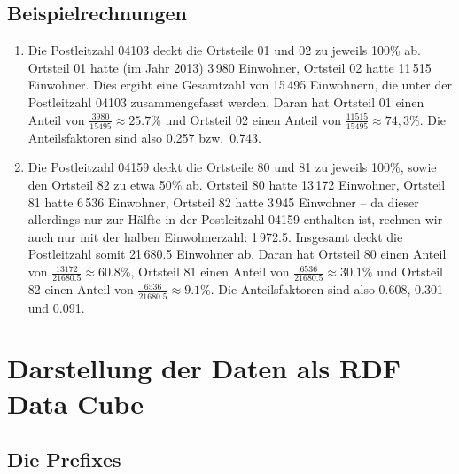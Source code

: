\documentclass[a4paper,11pt]{article}
\begin{document}
\subsection{Beispielrechnungen}
\begin{enumerate}
\item Die Postleitzahl 04103 deckt die Ortsteile 01 und 02 zu jeweils 100\%
  ab.  Ortsteil 01 hatte (im Jahr 2013) 3\,980 Einwohner, Ortsteil 02 hatte
  11\,515 Einwohner.  Dies ergibt eine Gesamtzahl von 15\,495 Einwohnern, die
  unter der Postleitzahl 04103 zusammengefasst werden. Daran hat Ortsteil 01
  einen Anteil von $\frac{3980}{15495}\approx 25.7\%$ und Ortsteil 02 einen
  Anteil von $\frac{11515}{15495}\approx 74,3\%$. Die Anteilsfaktoren sind
  also 0.257 bzw.\ 0.743.

\item Die Postleitzahl 04159 deckt die Ortsteile 80 und 81 zu jeweils 100\%,
  sowie den Ortsteil 82 zu etwa 50\% ab. Ortsteil 80 hatte 13\,172 Einwohner,
  Ortsteil 81 hatte 6\,536 Einwohner, Ortsteil 82 hatte 3\,945 Einwohner -- da
  dieser allerdings nur zur Hälfte in der Postleitzahl 04159 enthalten ist,
  rechnen wir auch nur mit der halben Einwohnerzahl: 1\,972.5. Insgesamt deckt
  die Postleitzahl somit 21\,680.5 Einwohner ab. Daran hat Ortsteil 80 einen
  Anteil von $\frac{13172}{21680.5}\approx 60.8\%$, Ortsteil 81 einen Anteil
  von $\frac{6536}{21680.5}\approx 30.1\%$ und Ortsteil 82 einen Anteil von
  $\frac{6536}{21680.5}\approx 9.1\%$. Die Anteilsfaktoren sind also 0.608,
  0.301 und 0.091.
\end{enumerate}

\section{Darstellung der Daten als RDF Data Cube}\label{Cube}

\subsection{Die Prefixes} \label{Prefixes}
 
\end{document}
